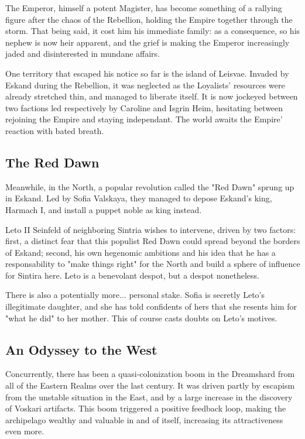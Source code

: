 The Emperor, himself a potent Magister, has become something of a rallying figure after the chaos of the Rebellion, holding the Empire together through the storm. That being said, it cost him his immediate family: as a consequence, so his nephew is now heir apparent, and the grief is making the Emperor increasingly jaded and disinterested in mundane affairs.

One territory that escaped his notice so far is the island of Leisvae. Invaded by Eskand during the Rebellion, it was neglected as the Loyalists' resources were already stretched thin, and managed to liberate itself. It is now jockeyed between two factions led respectively by Caroline and Isgrin Heim, hesitating between rejoining the Empire and staying independant. The world awaits the Empire' reaction with bated breath.

\subsection{The Red Dawn}

Meanwhile, in the North, a popular revolution called the "Red Dawn" sprung up in Eskand. Led by Sofia Valskaya, they managed to depose Eskand's king, Harmach I, and install a puppet noble as king instead. 

Leto II Seinfeld of neighboring Sintria wishes to intervene, driven by two factors: first, a distinct fear that this populist Red Dawn could spread beyond the borders of Eskand; second, his own hegenomic ambitions and his idea that he has a responsability to "make things right" for the North and build a sphere of influence for Sintira here. Leto is a benevolant despot, but a despot nonetheless.

There is also a potentially more... personal stake. Sofia is secretly Leto's illegitimate daughter, and she has told confidents of hers that she resents him for "what he did" to her mother. This of course casts doubts on Leto's motives. 


\subsection{An Odyssey to the West}
 
Concurrently, there has been a quasi-colonization boom in the Dreamshard from all of the Eastern Realms over the last century. It was driven partly by escapism from the unstable situation in the East, and by a large increase in the discovery of Voskari artifacts. This boom triggered a positive feedback loop, making the archipelago wealthy and valuable in and of itself, increasing its attractiveness even more.

